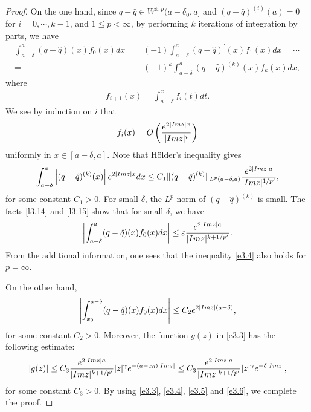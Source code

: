\documentclass[10pt,a4paper]{amsart}
\begin{document}
\begin{proof}
On the one hand, 
since $q-\hat{q}\in W^{k, p}(a-\delta_0, a]$ and $(q-\hat{q})^{(i)}(a)=0$ for $i=0, \cdots, k-1$, and $1\leq p<\infty$, 
by performing $k$ iterations of integration by parts, we have 
\begin{equation*}
\begin{split}
\int_{a-\delta}^a(q-\hat{q})(x)f_{0}(x)dx=&(-1)\int_{a-\delta}^a(q-\hat{q})^{\prime}(x)f_{1}(x)dx=\cdots\\
=&(-1)^{k}\int_{a-\delta}^a(q-\hat{q})^{(k)}(x)f_{k}(x)dx,
\end{split}
\end{equation*}
where 
\begin{align*}
f_{i+1}(x)=\int_{a-\delta}^{x} f_i(t)dt.
\end{align*}
We see by induction on $i$ that
\begin{equation}\label{l3.14}
f_i(x)
=O\left(\frac{e^{2|\textnormal{Im}z|x}}
{|\textnormal{Im}z|^{i}}\right)
\end{equation}
uniformly in $x\in[a-\delta,a]$. Note that H\"{o}lder's inequality gives 
\begin{equation}\label{l3.15}
\int_{a-\delta}^{a}
\left|(q-\hat{q})^{(k)}(x)\right|e^{2|\textnormal{Im}z|x}dx \leq C_1\|(q-\hat{q})^{(k)}\|_{L^{p}(a-\delta, a)}
\frac{e^{2|\textnormal{Im}z|a}}{|\textnormal{Im}z|^{1/p^{\prime}}},
\end{equation}
for some constant $C_1>0$. For small $\delta$, the $L^{p}$-norm of $(q-\hat{q})^{(k)}$ is small. 
The facts \eqref{l3.14} and \eqref{l3.15} show that for small $\delta$, we have 
\begin{equation}\label{e3.4}
\left|\int_{a-\delta}^{a}(q-\hat{q})(x)f_{0}(x)dx\right| 
\leq \varepsilon \frac{e^{2|\textnormal{Im}z|a}}{|\textnormal{Im}z|^{k+1/p^{\prime}}}.
\end{equation}
From the additional information, one sees that the inequality \eqref{e3.4} also holds for $p=\infty$.


On the other hand, 
\begin{equation}\label{e3.5}
\left|\int_{x_0}^{a-\delta}(q-\hat{q})(x)f_{0}(x)dx\right| 
\leq C_{2}e^{2|\textnormal{Im}z|(a-\delta)},
\end{equation}
for some constant $C_2>0$. Moreover, the function $g(z)$ in \eqref{e3.3} has the following estimate:
\begin{equation}\label{e3.6}
 |g(z)|
\leq C_{3}
\frac{e^{2|\textnormal{Im}z| a}}{|\textnormal{Im}z|^{k+1/p^{\prime}}} |z|^{\gamma}e^{-(a-x_0)|\textnormal{Im}z|}
\leq C_{3} 
\frac{e^{2|\textnormal{Im}z|a}}{|\textnormal{Im}z|^{k+1/p^{\prime}}} |z|^{\gamma}e^{-\delta|\textnormal{Im}z|},
\end{equation}
for some constant $C_3>0$. By using \eqref{e3.3}, \eqref{e3.4}, \eqref{e3.5} and \eqref{e3.6}, we complete the proof.
\end{proof}
\end{document}

